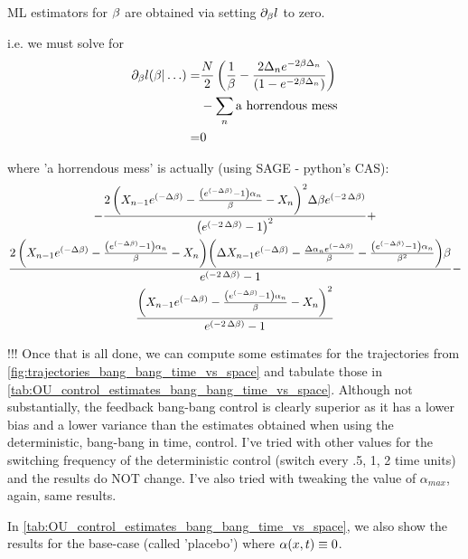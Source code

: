 \documentclass{article}
\begin{document}
ML estimators for ${\beta}$ are obtained via setting ${\partial}_{{\beta}} l$ to zero.

i.e. we must solve for 
\begin{align}
{\partial}_{\beta} l( {\beta}|\ldots)  
=& \frac{N}{2} \left(\frac 1 {{\beta}} - 
\frac{2 \Delta_n e^{-2{\beta}\Delta_n}}{(1-e^{-2{\beta}\Delta_n})} \right) \nonumber \\ 
& -\sum_n \textrm{a horrendous mess}  \nonumber
\\
=& 0 
\label{eq:OUML_estimate_beta}
\end{align}


where 'a horrendous mess' is actually (using SAGE - python's CAS):
\begin{multline}
-\frac{2 \, {\left(X_{n-1} e^{\left(-\Delta \beta\right)} -
\frac{{\left(e^{\left(-\Delta \beta\right)} - 1\right)}
{\alpha}_{n}}{\beta} - X_{n}\right)}^{2} \Delta \beta e^{\left(-2 \,
\Delta \beta\right)}}{{\left(e^{\left(-2 \, \Delta \beta\right)} -
1\right)}^{2}} 
+
\\
 \frac{2 \, {\left(X_{n-1} e^{\left(-\Delta
\beta\right)} - \frac{{\left(e^{\left(-\Delta \beta\right)} - 1\right)}
{\alpha}_{n}}{\beta} - X_{n}\right)} {\left(\Delta X_{n-1}
e^{\left(-\Delta \beta\right)} - \frac{\Delta {\alpha}_{n} e^{\left(-\Delta
\beta\right)}}{\beta} - \frac{{\left(e^{\left(-\Delta \beta\right)} -
1\right)} {\alpha}_{n}}{\beta^{2}}\right)} \beta}{e^{\left(-2 \, \Delta
\beta\right)} - 1} -
\\ \frac{{\left(X_{n-1} e^{\left(-\Delta
\beta\right)} - \frac{{\left(e^{\left(-\Delta \beta\right)} - 1\right)}
{\alpha}_{n}}{\beta} - X_{n}\right)}^{2}}{e^{\left(-2 \, \Delta
\beta\right)} - 1}
\end{multline}

!!!
Once that is all done, we can compute some estimates for the trajectories
from \cref{fig:trajectories_bang_bang_time_vs_space} and tabulate those in
\cref{tab:OU_control_estimates_bang_bang_time_vs_space}. Although not
substantially, the feedback bang-bang control is clearly superior as it has a 
lower bias and a lower variance than the estimates obtained when using the
deterministic, bang-bang in time, control. I've tried with other values for the
switching frequency of the deterministic control (switch every .5, 1, 2
time units) and the results do NOT change. I've also tried with tweaking the
value of $\alpha_{max}$, again, same results. 

In \cref{tab:OU_control_estimates_bang_bang_time_vs_space}, we also show the
results for the base-case (called 'placebo') where ${\alpha}(x,t) \equiv 0$.
\end{document}
